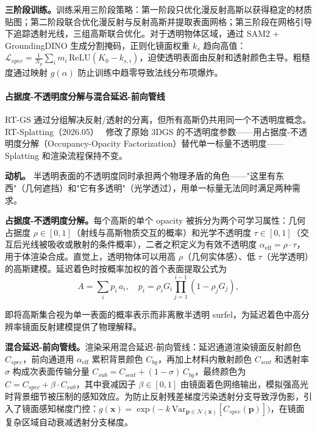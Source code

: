 \textbf{三阶段训练。}训练采用三阶段策略：第一阶段只优化漫反射高斯以获得稳定的材质贴图；第二阶段联合优化漫反射与反射高斯并提取表面网格；第三阶段在网格引导下追踪透射光线，三组高斯联合优化。对于透明物体区域，通过 SAM2 + GroundingDINO 生成分割掩码，正则化镜面权重 $k_s$ 趋向高值：$\mathcal{L}_{spec}=\frac{1}{N_p}\sum_i m_i\,\text{ReLU}(K_0-k_{s,i})$，迫使透明表面由反射和透射颜色主导。粗糙度通过映射 $g(\alpha)$ 防止训练中趋零导致法线分布项爆炸。

\paragraph{占据度-不透明度分解与混合延迟-前向管线}

RT-GS 通过分组解决反射/透射的分离，但所有高斯仍共用同一个不透明度概念。RT-Splatting（2026.05）~\cite{2605_18263} 修改了原始 3DGS 的不透明度参数——用占据度-不透明度分解（Occupancy-Opacity Factorization）替代单一标量不透明度——Splatting 和渲染流程保持不变。

\textbf{动机。} 半透明表面的不透明度同时承担两个物理矛盾的角色——"这里有东西"（几何遮挡）和"它有多透明"（光学透过），用单一标量无法同时满足两种需求。

\textbf{占据度-不透明度分解。}每个高斯的单个 opacity 被拆分为两个可学习属性：几何占据度 $\rho\in[0,1]$（射线与高斯物质交互的概率）和光学不透明度 $\tau\in[0,1]$（交互后光线被吸收或散射的条件概率），二者之积定义为有效不透明度 $\alpha_{\text{eff}}=\rho\cdot\tau$，用于体渲染合成。直觉上，透明物体可以用高 $\rho$（几何实体感）、低 $\tau$（光学透明）的高斯建模。延迟着色时按概率加权的首个表面提取公式为
\begin{equation}
A = \sum_i p_i\,a_i, \quad p_i = \rho_i G_i \prod_{j=1}^{i-1}(1-\rho_j G_j),
\end{equation}

即将高斯集合视为单一表面的概率表示而非离散半透明 surfel，为延迟着色中高分辨率镜面反射建模提供了物理解释。

\textbf{混合延迟-前向管线。}渲染采用混合延迟-前向管线：延迟通道渲染镜面反射颜色 $C_{spec}$，前向通道用 $\alpha_{\text{eff}}$ 累积背景颜色 $C_{bg}$，再加上材料内散射颜色 $C_{scat}$ 和透射率 $\sigma$ 构成次表面传输分量 $C_{sub}=C_{scat}+(1-\sigma)\,C_{bg}$，最终颜色为 $C=C_{spec}+\beta\cdot C_{sub}$，其中衰减因子 $\beta\in[0,1]$ 由镜面着色网络输出，模拟强高光时背景细节被压制的感知效应。为防止反射残差梯度污染透射分支导致浮伪影，引入了镜面感知梯度门控：$g(\mathbf{x})=\exp\!\bigl(-k\,\text{Var}_{\mathbf{p}\in\mathcal{N}(\mathbf{x})}[C_{spec}(\mathbf{p})]\bigr)$，在镜面复杂区域自动衰减透射分支梯度。

